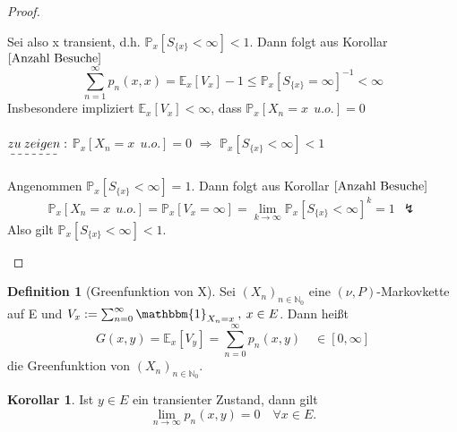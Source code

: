 \documentclass[a4paper,12pt]{scrartcl}
\theoremstyle{definition}
\newtheorem{kol}{Korollar}[section]
\newtheorem{defi}{Definition}[section]
\begin{document}
\begin{proof}
\begin{itemize}
Sei also x transient, d.h. $\mathbb{P}_{x}[S_{\lbrace x \rbrace} < \infty] < 1$. Dann folgt aus Korollar $\ref{Anzahl Besuche}$
\begin{equation*}
\sum_{n=1}^{\infty} p_{n}(x,x) = \mathbb{E}_{x}[V_{x}] - 1 \leq \mathbb{P}_{x}[S_{\lbrace x \rbrace} = \infty]^{-1} < \infty
\end{equation*}
Insbesondere impliziert $\mathbb{E}_{x}[V_{x}] < \infty$, dass $\mathbb{P}_{x}[X_{n} = x \: \: u.o.] = 0$
\\
\\
$\dashuline{zu \: zeigen}:$ $\mathbb{P}_{x}[X_{n} = x \: \: u.o.] = 0$ $\Rightarrow$ $\mathbb{P}_{x}[S_{\lbrace x \rbrace} < \infty] < 1$
\\
\\
Angenommen $\mathbb{P}_{x}[S_{\lbrace x \rbrace} < \infty] = 1$. Dann folgt aus Korollar $\ref{Anzahl Besuche}$
\begin{equation*}
\mathbb{P}_{x}[X_{n} = x \: \: u.o.] = \mathbb{P}_{x}[V_{x} = \infty] = \lim_{k \to \infty} \mathbb{P}_{x}[S_{\lbrace x \rbrace} < \infty]^{k} = 1 \: \: \lightning
\end{equation*}
Also gilt $\mathbb{P}_{x}[S_{\lbrace x \rbrace} < \infty] < 1$.
\end{itemize}
\end{proof}
\clearpairofpagestyles
\ihead{\headmark}
\ohead{\pagemark}
\pagestyle{scrheadings}
\begin{defi}[Greenfunktion von X]
Sei $(X_{n})_{n \in \mathbb{N}_{0}}$ eine $(\nu,P)$-Markovkette auf E und $V_{x} := \sum_{n=0}^{\infty} \mathbbm{1}_{X_{n} = x} \: , \: x \in E $. Dann heißt 
\begin{equation*}
G(x,y) = \mathbb{E}_{x}[V_{y}] = \sum_{n=0}^{\infty} p_{n}(x,y) \quad \in [0,\infty]
\end{equation*}
die Greenfunktion von $(X_{n})_{n \in \mathbb{N}_{0}}$.
\end{defi}
\begin{kol}
\label{transienter Zustand dann lim n -> unendl. pn(x,y) = 0}
Ist $y \in E$ ein transienter Zustand, dann gilt
\begin{equation*}
\lim_{n \to \infty} p_{n}(x,y) = 0 \quad \forall x \in E.
\end{equation*}
\end{kol}
\end{document}
